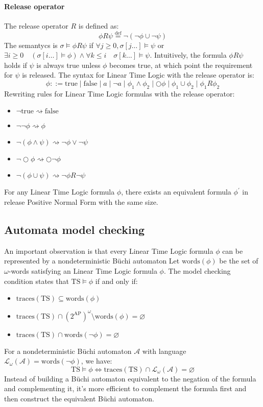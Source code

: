 \paragraph*{Release operator}
The release operator $R$ is defined as: 
\[\phi R \psi \overset{\text{def}}{=}\lnot(\lnot\phi\cup\lnot\psi)\]
\noindent The semantycs is $\sigma\models\phi R \psi$ if $\forall j \geq 0, \sigma[j\dots]\models\psi$ or $\exists i \geq 0 \quad (\sigma[i\dots]\models\phi)\land \forall k \leq i \quad \sigma[k\dots]\models\psi$.
Intuitively, the formula $\phi R \psi$ holds if $\psi$ is always true unless $\phi$ becomes true, at which point the requirement for $\psi$ is released. 
The syntax for Linear Time Logic with the release operator is:
\[\phi::=\text{true}\mid\text{false}\mid a \mid\lnot a\mid \phi_1\land\phi_2\mid\bigcirc\phi\mid\phi_1\cup\phi_2\mid\phi_1 R \phi_2\]
\noindent Rewriting rules for Linear Time Logic formulas with the release operator:
\begin{itemize}
    \item $\lnot\text{true}\rightsquigarrow \text{false}$
    \item $\lnot\lnot\phi\rightsquigarrow \phi$
    \item $\lnot(\phi\land\psi)\rightsquigarrow\lnot\phi\lor\lnot\psi$
    \item $\lnot\bigcirc\phi\rightsquigarrow\bigcirc\lnot\phi$
    \item $\lnot(\phi\cup\psi)\rightsquigarrow\lnot\phi R \lnot\psi$
\end{itemize}
\noindent For any Linear Time Logic formula $\phi$, there exists an equivalent formula $\phi^\prime$ in release Positive Normal Form with the same size.

\subsection{Automata model checking}
An important observation is that every Linear Time Logic formula $\phi$ can be represented by a nondeterministic Büchi automaton
Let $\text{words}(\phi)$ be the set of $\omega$-words satisfying an Linear Time Logic formula $\phi$. 
The model checking condition states that $\text{TS}\models\phi$ if and only if: 
\begin{itemize}
    \item $\text{traces}(\text{TS}) \subseteq \text{words}(\phi)$
    \item $\text{traces}(\text{TS}) \cap \left( 2^{\text{AP}} \right)^{\omega} \setminus \text{words}(\phi) = \varnothing$
    \item $\text{traces}(\text{TS}) \cap \text{words}(\lnot \phi) = \varnothing$
\end{itemize}
\noindent For a nondeterministic Büchi automaton $\mathcal{A}$ with language $\mathcal{L}_{\omega}(\mathcal{A})=\text{words}(\lnot\phi)$, we have:
\[\text{TS}\models\phi\Leftrightarrow\text{traces}(\text{TS})\cap\mathcal{L}_{\omega}(\mathcal{A})=\varnothing\]
Instead of building a Büchi automaton equivalent to the negation of the formula and complementing it, it's more efficient to complement the formula first and then construct the equivalent Büchi automaton.


